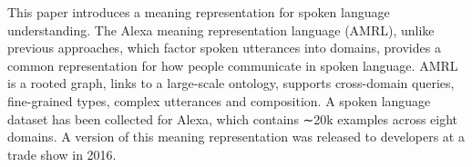 This paper introduces a meaning representation for spoken language understanding. The Alexa meaning representation language (AMRL), unlike previous approaches, which factor spoken utterances into domains, provides a common representation for how people communicate in spoken language. AMRL is a rooted graph, links to a large-scale ontology, supports cross-domain queries, fine-grained types, complex utterances and composition. A spoken language dataset has been collected for Alexa, which contains ∼20k examples across eight domains. A version of this meaning representation was released to developers at a trade show in 2016.
